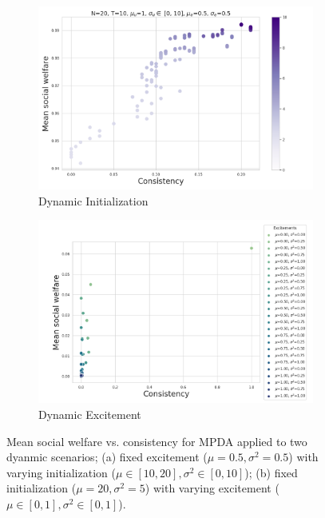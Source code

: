 \begin{figure}
    \centering
        \begin{subfigure}[b]{0.49\textwidth}
         \centering
         \includegraphics[width=\textwidth]{figures/mpda_dynamics_initliazation.png}
         \caption{Dynamic Initialization}
         \label{fig:init}
        \end{subfigure}
         \begin{subfigure}[b]{0.49\textwidth}
         \centering
         \includegraphics[width=\textwidth]{figures/mpda_dynamics_excitement.png}
         \caption{Dynamic Excitement}
         \label{fig:excite}
     \end{subfigure}
    \caption{Mean social welfare vs. consistency for MPDA applied to two dyanmic scenarios; (a) fixed excitement ($\mu=0.5, \sigma^2=0.5$) with  varying initialization ($\mu \in [10, 20], \sigma^2 \in [0, 10]$); (b) fixed initialization ($\mu=20, \sigma^2=5$) with varying excitement ($\mu \in [0, 1], \sigma^2 \in [0, 1]$).}
    \label{fig:mpda_dynamics}
\end{figure}